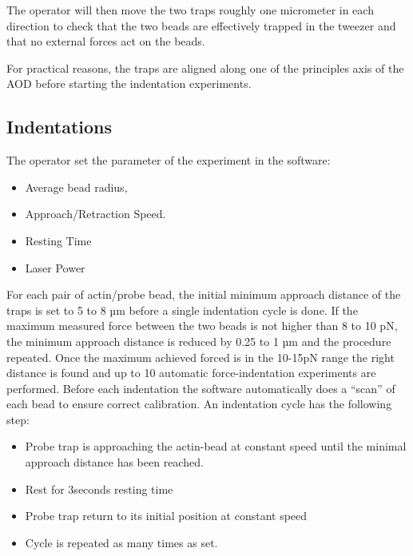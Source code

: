 \documentclass[A4paperpaper,11pt,english]{sphinxmanual}
\begin{document}
The operator will then move the two traps roughly one micrometer in each
direction to check that the two beads are effectively trapped in the tweezer and
that no external forces act on the beads.

For practical reasons, the traps are aligned along one of the principles axis
of the AOD before starting the indentation experiments.


\subsection{Indentations}
\label{parts/part2:indentations}
The operator set the parameter of the experiment in the software:
\begin{itemize}
\item {} 
Average bead radius,

\item {} 
Approach/Retraction Speed.

\item {} 
Resting Time

\item {} 
Laser Power

\end{itemize}

For each pair of actin/probe bead, the initial minimum approach distance of the
traps is set to 5 to 8 µm before a single indentation cycle is done. If the
maximum measured force between the two beads is not higher than 8 to 10 pN, the
minimum approach distance is reduced by 0.25 to 1 µm and the procedure
repeated. Once the maximum achieved forced is in the 10-15pN range the right
distance is found and up to 10 automatic force-indentation experiments are
performed. Before each indentation the software automatically does a ``scan'' of
each bead to ensure correct calibration. An indentation cycle has the
following step:
\begin{itemize}
\item {} 
Probe trap is approaching the actin-bead at constant speed until the minimal approach distance has been reached.

\item {} 
Rest for 3seconds resting time

\item {} 
Probe trap return to its initial position at constant speed

\item {} 
Cycle is repeated as many times as set.

\end{itemize}
\end{document}
